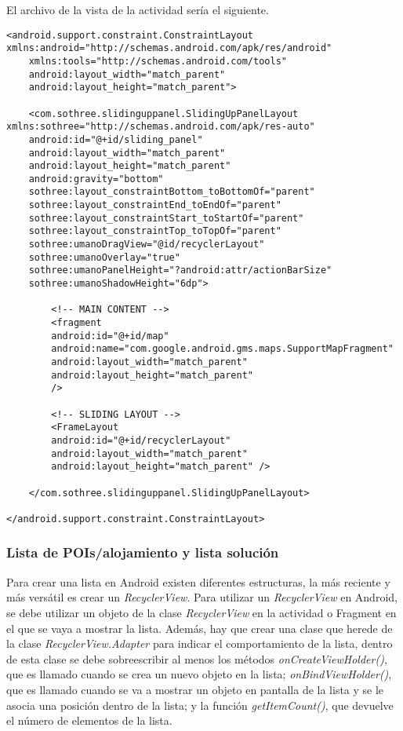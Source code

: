\newpage
El archivo de la vista de la actividad sería el siguiente.
\begin{lstlisting}[caption=Código XML de la vista de la actividad principal.]
<android.support.constraint.ConstraintLayout xmlns:android="http://schemas.android.com/apk/res/android"
	xmlns:tools="http://schemas.android.com/tools"
	android:layout_width="match_parent"
	android:layout_height="match_parent">

	<com.sothree.slidinguppanel.SlidingUpPanelLayout xmlns:sothree="http://schemas.android.com/apk/res-auto"
	android:id="@+id/sliding_panel"
	android:layout_width="match_parent"
	android:layout_height="match_parent"
	android:gravity="bottom"
	sothree:layout_constraintBottom_toBottomOf="parent"
	sothree:layout_constraintEnd_toEndOf="parent"
	sothree:layout_constraintStart_toStartOf="parent"
	sothree:layout_constraintTop_toTopOf="parent"
	sothree:umanoDragView="@id/recyclerLayout"
	sothree:umanoOverlay="true"
	sothree:umanoPanelHeight="?android:attr/actionBarSize"
	sothree:umanoShadowHeight="6dp">

		<!-- MAIN CONTENT -->
		<fragment
		android:id="@+id/map"
		android:name="com.google.android.gms.maps.SupportMapFragment"
		android:layout_width="match_parent"
		android:layout_height="match_parent"
		/>
		
		<!-- SLIDING LAYOUT -->
		<FrameLayout
		android:id="@+id/recyclerLayout"
		android:layout_width="match_parent"
		android:layout_height="match_parent" />
	
	</com.sothree.slidinguppanel.SlidingUpPanelLayout>

</android.support.constraint.ConstraintLayout>
\end{lstlisting}
\subsubsection{Lista de POIs/alojamiento y lista solución}
Para crear una lista en Android existen diferentes estructuras, la más reciente y más versátil es crear un \textit{RecyclerView}. Para utilizar un \textit{RecyclerView} en Android, se debe utilizar un objeto de la clase \textit{RecyclerView} en la actividad o Fragment en el que se vaya a mostrar la lista. Además, hay que crear una clase que herede de la clase \textit{RecyclerView.Adapter} para indicar el comportamiento de la lista, dentro de esta clase se debe sobreescribir al menos los métodos \textit{onCreateViewHolder()}, que es llamado cuando se crea un nuevo objeto en la lista; \textit{onBindViewHolder()}, que es llamado cuando se va a mostrar un objeto en pantalla de la lista y se le asocia una posición dentro de la lista; y la función \textit{getItemCount()}, que devuelve el número de elementos de la lista.\newline

